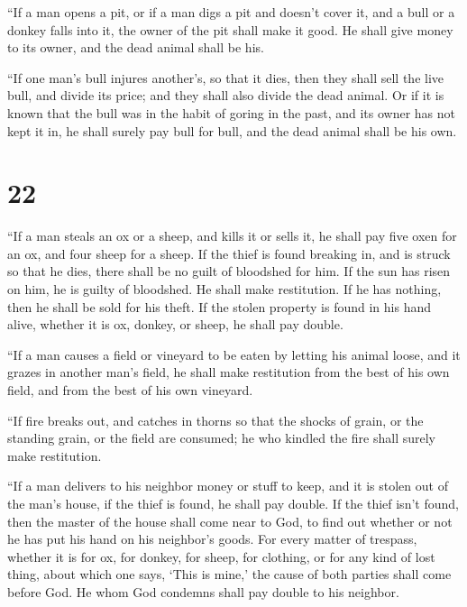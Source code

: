  ``If a man opens a pit, or if a man digs a pit and doesn't
cover it, and a bull or a donkey falls into it,  the owner
of the pit shall make it good. He shall give money to its owner, and the
dead animal shall be his.

 ``If one man's bull injures another's, so that it dies,
then they shall sell the live bull, and divide its price; and they shall
also divide the dead animal.  Or if it is known that the
bull was in the habit of goring in the past, and its owner has not kept
it in, he shall surely pay bull for bull, and the dead animal shall be
his own.

\hypertarget{section-21}{%
\section{22}\label{section-21}}

 ``If a man steals an ox or a sheep, and kills it or sells
it, he shall pay five oxen for an ox, and four sheep for a sheep.
 If the thief is found breaking in, and is struck so that he
dies, there shall be no guilt of bloodshed for him.  If the
sun has risen on him, he is guilty of bloodshed. He shall make
restitution. If he has nothing, then he shall be sold for his theft.
 If the stolen property is found in his hand alive, whether
it is ox, donkey, or sheep, he shall pay double.

 ``If a man causes a field or vineyard to be eaten by
letting his animal loose, and it grazes in another man's field, he shall
make restitution from the best of his own field, and from the best of
his own vineyard.

 ``If fire breaks out, and catches in thorns so that the
shocks of grain, or the standing grain, or the field are consumed; he
who kindled the fire shall surely make restitution.

 ``If a man delivers to his neighbor money or stuff to keep,
and it is stolen out of the man's house, if the thief is found, he shall
pay double.  If the thief isn't found, then the master of
the house shall come near to God, to find out whether or not he has put
his hand on his neighbor's goods.  For every matter of
trespass, whether it is for ox, for donkey, for sheep, for clothing, or
for any kind of lost thing, about which one says, `This is mine,' the
cause of both parties shall come before God. He whom God condemns shall
pay double to his neighbor.

